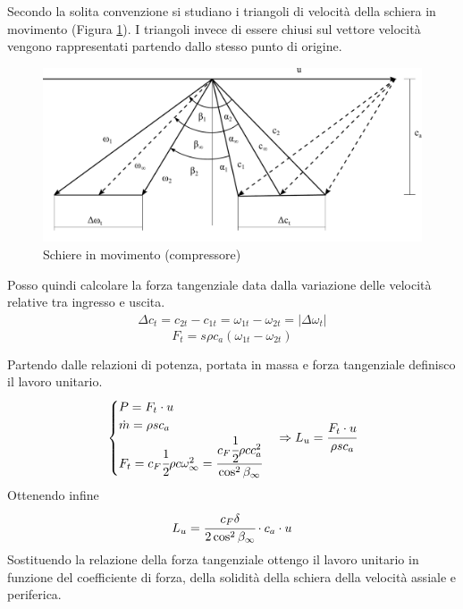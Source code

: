 Secondo la solita convenzione si studiano i triangoli di velocità della schiera in movimento (Figura \ref{fig:SchiereCompr}). I triangoli invece di essere chiusi sul vettore velocità vengono rappresentati partendo dallo stesso punto di origine. 
\begin{figure}
\centering
  \includegraphics[width=\textwidth]{fig/SchiereCompr.pdf}
\caption{Schiere in movimento (compressore)}
\label{fig:SchiereCompr}
\end{figure}
Posso quindi calcolare la forza tangenziale data dalla variazione delle velocità relative tra ingresso e uscita.
\begin{align*}
\Delta c_t = c_{2t} - c_{1t} = \omega_{1t} - \omega_{2t} = |\Delta \omega_t |
\end{align*}
\begin{equation}
F_t = s \rho c_a (\omega_{1t} - \omega_{2t})
\end{equation}

Partendo dalle relazioni di potenza, portata in massa e forza tangenziale definisco il lavoro unitario.
\begin{equation}
\begin{cases}
P=F_t \cdot u\\
\dot{m} = \rho s c_a\\
F_t = c_F \cfrac{1}{2} \rho c \omega_{\infty}^2 = \cfrac{c_F \cfrac{1}{2} \rho c c_a^2}{\cos^2 \beta_{\infty}}
\end{cases}
\Rightarrow
L_u = \cfrac{F_t \cdot u}{\rho s c_a}
\end{equation}
Ottenendo infine
\begin{equation}
L_u = \cfrac{c_F \delta}{2 \cos^2 \beta_{\infty}} \cdot c_a \cdot u
\end{equation}
Sostituendo la relazione della forza tangenziale ottengo il lavoro unitario in funzione del coefficiente di forza, della solidità della schiera della velocità assiale e periferica. 

